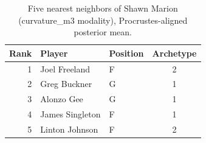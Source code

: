 \begin{table}[htbp]
  \centering\small
  \begin{tabular}{rllc}
    \toprule
    Rank & Player & Position & Archetype \\
    \midrule
    1 & Joel Freeland & F & 2 \\
    2 & Greg Buckner & G & 1 \\
    3 & Alonzo Gee & G & 1 \\
    4 & James Singleton & F & 1 \\
    5 & Linton Johnson & F & 2 \\
    \bottomrule
  \end{tabular}
  \caption{Five nearest neighbors of Shawn Marion (curvature_m3 modality), Procrustes-aligned posterior mean.}
  \label{tab:Shawn_Marion_neighbors_curvature_m3}
\end{table}

